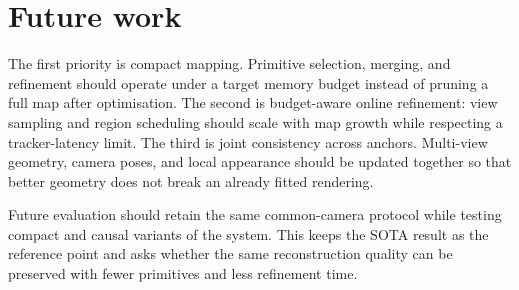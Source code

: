 \section{Future work}

The first priority is compact mapping. Primitive selection, merging, and
refinement should operate under a target memory budget instead of pruning a
full map after optimisation. The second is budget-aware online refinement:
view sampling and region scheduling should scale with map growth while
respecting a tracker-latency limit. The third is joint consistency across
anchors. Multi-view geometry, camera poses, and local appearance should be
updated together so that better geometry does not break an already fitted
rendering.

Future evaluation should retain the same common-camera protocol while testing
compact and causal variants of the system. This keeps the SOTA result as the
reference point and asks whether the same reconstruction quality can be
preserved with fewer primitives and less refinement time.
